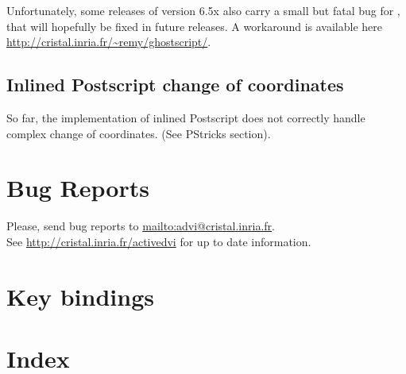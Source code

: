 \documentclass[12pt]{article}
\begin{document}
Unfortunately, some releases of version 6.5x also carry a small but
fatal bug for \ActiveDVI, that will hopefully be fixed in future
releases. A workaround is available here
\url{http://cristal.inria.fr/~remy/ghostscript/}.

\subsection*{Inlined Postscript change of coordinates}

So far, the implementation of inlined Postscript does not correctly handle
complex change of coordinates.  (See PStricks section). 

\section {Bug Reports}

Please, send bug reports to 
\url{mailto:advi@cristal.inria.fr}. 
\\
See \url{http://cristal.inria.fr/activedvi} for up to date information.


\section {Key bindings}

\section {Index}

\printindex
\end{document}
